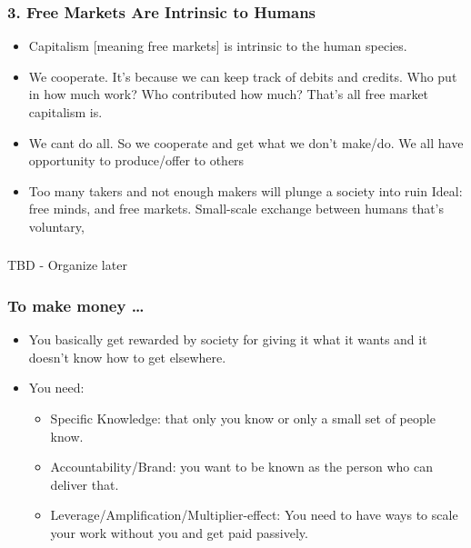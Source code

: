 \begin{frame}[fragile]
\frametitle{3. Free Markets Are Intrinsic to Humans}
\begin{itemize}
\item Capitalism [meaning free markets] is intrinsic to the human species. 
\item We cooperate. It’s because we can keep track of debits and credits. Who put in how much work? Who contributed how much? That’s all free market capitalism is.
\item We cant do all. So we cooperate and get what we don't make/do. We all have opportunity to produce/offer to others
\item Too many takers and not enough makers will plunge a society into ruin
\iteam Ideal: free minds, and free markets. Small-scale exchange between humans that's voluntary,
\end{itemize}
\end{frame}


\begin{frame}[fragile]\frametitle{}
\begin{center}
{\Large TBD - Organize later}

\end{center}
\end{frame}

\begin{frame}[fragile]
\frametitle{To make money \ldots}
\begin{itemize}
\item You basically get rewarded by society for giving it what it wants and it doesn’t know how to get elsewhere.
\item You need:
\begin{itemize}
\item Specific Knowledge: that only you know or only a small set of people know.
\item Accountability/Brand: you want to be known as the person who can deliver that.
\item Leverage/Amplification/Multiplier-effect: You need to have ways to scale your work without you and get paid passively.
\end{itemize}
\end{itemize}
\end{frame}

